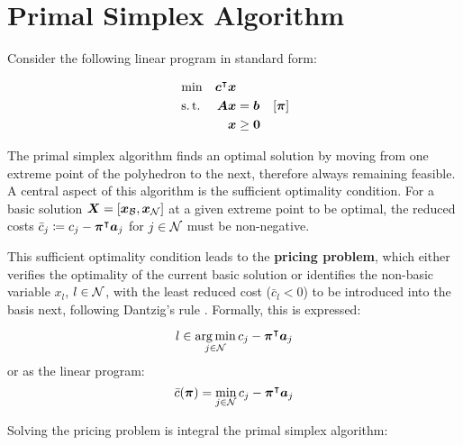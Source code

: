 \section{Primal Simplex Algorithm}\label{sec:preliminaries_psa}
Consider the following linear program in standard form:

\begin{equation}\label{eq:lp_standard}
\begin{aligned}
&\min & {\bm{c}}^\intercal {\bm{x}} & & \\
&\operatorname{s.t.} & {\bm{A}} {\bm{x}} & = {\bm{b}} & \left[{\bm{\pi}}\right] \\
&& {\bm{x}} & \geq {\bm{0}} &
\end{aligned}
\end{equation}

The primal simplex algorithm \cite{dantzig1997simplex} finds an optimal solution by moving from one extreme point of the polyhedron to the next, therefore always remaining feasible. A central aspect of this algorithm is the sufficient optimality condition. For a basic solution ${\bm{X}} = \left[{\bm{x}}_{\mathcal{B}}, {\bm{x}}_{\mathcal{N}}\right]$ at a given extreme point to be optimal, the reduced costs $\bar{c}_j \coloneqq c_j - \vec{\pi}\transpose \vec{a}_j$ for $j \in \mathcal{N}$ must be non-negative.

This sufficient optimality condition leads to the \textbf{pricing problem}, which either verifies the optimality of the current basic solution or identifies the non-basic variable $x_l$, $l \in \mathcal{N}$, with the least reduced cost ($\bar{c}_l < 0$) to be introduced into the basis next, following Dantzig's rule \cite{dantzig1997simplex,ploskas2014pivoting,thebook}. Formally, this is expressed:

\begin{equation*}
l \in \underset{j \in \mathcal{N}}{\arg\min} \, c_j - {\bm{\pi}}^\intercal {\bm{a}}_j
\end{equation*}
or as the linear program:
\begin{equation}\label{eq:psa_pp}
\bar{c}(\vec{\pi}) = \underset{j \in \indexset{N}}{\min} \, c_j - \vec{\pi}\transpose \vec{a}_j
\end{equation}

Solving the pricing problem is integral the primal simplex algorithm:

